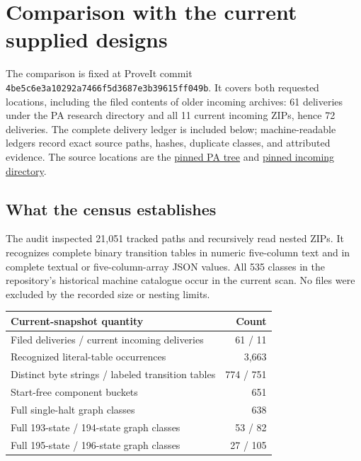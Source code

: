 \section{Comparison with the current supplied designs}
\label{sec:current-comparison}

The comparison is fixed at ProveIt commit
\texttt{4be5c6e3a10292a7466f5d3687e3b39615ff049b}.
It covers both requested locations, including the filed contents of older
incoming archives: 61 deliveries under the PA research directory and all
11 current incoming ZIPs, hence 72 deliveries. The complete delivery ledger
is included below; machine-readable ledgers record exact source paths,
hashes, duplicate classes, and attributed evidence.
The source locations are the
\href{https://github.com/VladimirReshetnikov/ProveIt/tree/4be5c6e3a10292a7466f5d3687e3b39615ff049b/Computability/BusyBeaver/Research/PA}{pinned PA tree}
and
\href{https://github.com/VladimirReshetnikov/ProveIt/tree/4be5c6e3a10292a7466f5d3687e3b39615ff049b/docs/incoming}{pinned incoming directory}.

\subsection{What the census establishes}

The audit inspected 21,051 tracked paths and recursively read nested ZIPs.
It recognizes complete binary transition tables in numeric five-column
text and in complete textual or five-column-array JSON values. All 535
classes in the repository's historical machine catalogue occur in the
current scan. No files were excluded by the recorded size or nesting limits.

\begin{center}
\begin{tabular}{@{}lr@{}}
\toprule
Current-snapshot quantity & Count\\\midrule
Filed deliveries / current incoming deliveries &61 / 11\\
Recognized literal-table occurrences &3,663\\
Distinct byte strings / labeled transition tables &774 / 751\\
Start-free component buckets &651\\
Full single-halt graph classes &638\\
Full 193-state / 194-state graph classes &53 / 82\\
Full 195-state / 196-state graph classes &27 / 105\\
\bottomrule
\end{tabular}
\end{center}


